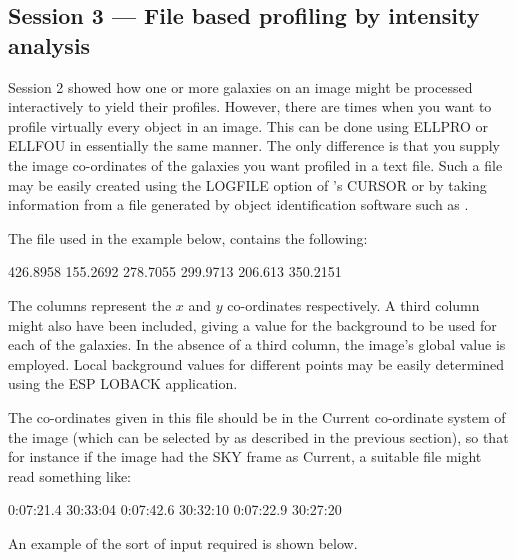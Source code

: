 \documentclass[twoside,11pt]{starlink}
\begin{document}
\subsection{Session 3 --- File based profiling by intensity analysis}

Session 2 showed how one or more galaxies on an image might be
processed interactively to yield their profiles. However, there are
times when you want to profile virtually every object in an image.
This can be done using ELLPRO or ELLFOU in essentially the same manner.
The only difference is that you supply the image co-ordinates of the galaxies
you want profiled in a text file. Such a file may be easily created
using the LOGFILE option of 's CURSOR or by taking
information from a file generated by object identification software such as
.

The file used in the example below, contains the following:

\begin{terminalv}
426.8958 155.2692
278.7055 299.9713
206.613 350.2151
\end{terminalv}

The columns represent the $x$ and $y$ co-ordinates respectively. A third column
might also have been included, giving a value for the background to be
used for each of the galaxies. In the absence of a third column, the image's
global value is employed. Local background values for different points may be
easily determined using the ESP LOBACK application.

The co-ordinates given in this file should be in the
Current co-ordinate system of the image (which can be selected by
 as described in the previous section),
so that for instance if the image had the SKY frame as Current,
a suitable file might read something like:

\begin{terminalv}
 0:07:21.4   30:33:04
 0:07:42.6   30:32:10
 0:07:22.9   30:27:20
\end{terminalv}

An example of the sort of input required is shown below.
\end{document}
